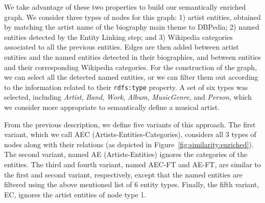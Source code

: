 We take advantage of these two properties to build our semantically enriched graph.
We consider three types of nodes for this graph: 1) artist entities, obtained by matching the artist name of the biography main theme to DBPedia; 2) named entities detected by the Entity Linking step; and 3) Wikipedia categories associated to all the previous entities.
Edges are then added between artist entities and the named entities detected in their biographies, and between entities and their corresponding Wikipedia categories.
For the construction of the graph, we can select all the detected named entities, or we can filter them out according to the information related to their \texttt{rdfs:type} property. A set of six types was selected, including \textit{Artist}, \textit{Band}, \textit{Work}, \textit{Album}, \textit{MusicGenre}, and \textit{Person}, which we consider more appropriate to semantically define a musical artist.

From the previous description, we define five variants of this approach. The first variant, which we call AEC (Artists-Entities-Categories), considers all 3 types of nodes along with their relations (as depicted in Figure~\ref{fig:similarity:enriched}). The second variant, named AE (Artists-Entities) ignores the categories of the entities. The third and fourth variant, named AEC-FT and AE-FT, are similar to the first and second variant, respectively, except that the named entities are filtered using the above mentioned list of 6 entity types. Finally, the fifth variant, EC, ignores the artist entities of node type 1.


%
%

